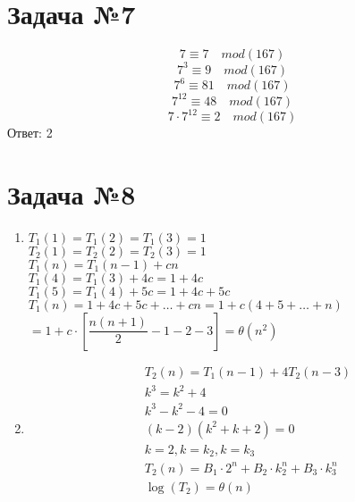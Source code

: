 \documentclass[a4paper,12pt]{article}
\begin{document}
\section*{Задача №7}
  $$7 \equiv 7 \quad mod(167)$$
  $$7^3 \equiv 9 \quad mod(167)$$
  $$7^6 \equiv 81 \quad mod(167)$$
  $$7^{12} \equiv 48 \quad mod(167)$$
  $$7 \cdot 7^{12} \equiv 2 \quad mod(167)$$
  Ответ: 2

\section*{Задача №8}
\begin{enumerate}
  \item 
  $T_{1}\left( 1\right) =T_{1}\left( 2\right) =T_{1}\left( 3\right) =1$ \\
  $T_{2}\left( 1\right) =T_{2}\left( 2\right) =T_{2}\left( 3\right) =1 $ \\
  $T_{1}\left( n\right) =T_{1}\left( n-1\right) +cn$ \\
  $T_{1}\left( 4\right) =T_{1}\left( 3\right) +4c=1+4c$ \\ 
  $T_{1}\left( 5\right) =T_{1}\left( 4\right) +5c=1+4c+5c$ \\
  $T_{1}\left( n\right) =1+4c+5c+\ldots +cn=1+c\left( 4+5+\ldots +n\right)$ \\
  $=1+c\cdot \left[ \dfrac{n\left( n+1\right) }{2}-1-2-3\right] =\theta \left( n^{2}\right)$
  \item
    \begin{align*}
    &  T_{2}\left( n\right) =T_{1}\left( n-1\right) +4T_{2}\left( n-3\right) \\
    &  k^{3}=k^{2}+4 \\
    &  k^{3}-k^{2}-4=0 \\
    &  \left( k-2\right) \left( k^{2}+k+2\right) =0 \\
    &  k=2,k=k_{2},k=k_{3} \\
    &  T_{2}\left( n\right) =B_{1}\cdot 2^{n}+B_{2}\cdot k_{2}^{n}+B_{3}\cdot k_{3}^{n} \\
    &  \log \left( T_{2}\right) =\theta \left( n\right)
    \end{align*}

\end{enumerate}

  
\end{document}
